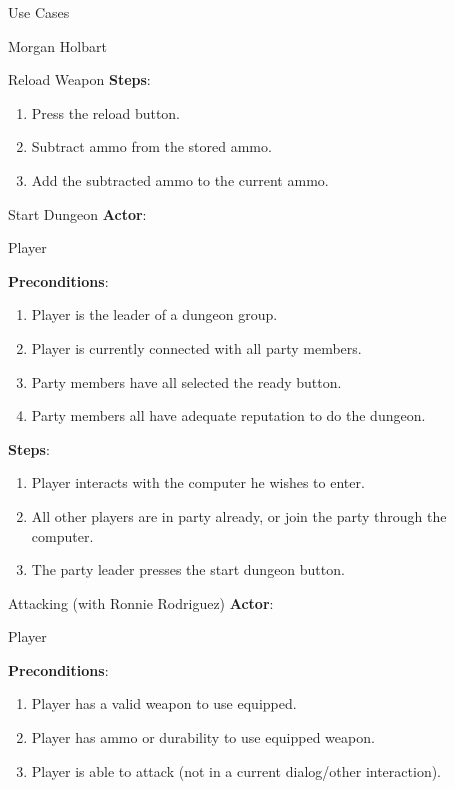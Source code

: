 \documentclass[12pt]{report}
\begin{document}
\begin{section}{Use Cases}
\begin{subsection}{Morgan Holbart}
\begin{subsubsection}{Reload Weapon}
\textbf{Steps}:

\begin{enumerate}
\item Press the reload button.
\item Subtract ammo from the stored ammo.
\item Add the subtracted ammo to the current ammo.
\end{enumerate}
\end{subsubsection}

\begin{subsubsection}{Start Dungeon}
\textbf{Actor}:

Player

\textbf{Preconditions}:

\begin{enumerate}
\item Player is the leader of a dungeon group.
\item Player is currently connected with all party members.
\item Party members have all selected the ready button.
\item Party members all have adequate reputation to do the dungeon.
\end{enumerate}

\textbf{Steps}:

\begin{enumerate}
\item Player interacts with the computer he wishes to enter.
\item All other players are in party already, or join the party through the
computer.
\item The party leader presses the start dungeon button.
\end{enumerate}
\end{subsubsection}

\begin{subsubsection}{Attacking (with Ronnie Rodriguez)}
\textbf{Actor}:

Player

\textbf{Preconditions}:

\begin{enumerate}
\item Player has a valid weapon to use equipped.
\item Player has ammo or durability to use equipped weapon.
\item Player is able to attack (not in a current dialog/other interaction).
\end{enumerate}


\end{subsubsection}
\end{subsection}
\end{section}
\end{document}
